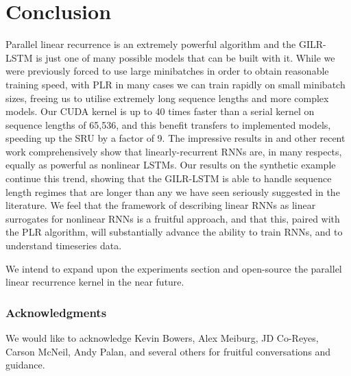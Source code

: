 \documentclass{article}
\begin{document}
\section{Conclusion}
Parallel linear recurrence is an extremely powerful algorithm and the GILR-LSTM
is just one of many possible models that can be built with it. While we were
previously forced to use large minibatches in order to obtain reasonable
training speed, with PLR in many cases we can train rapidly on small minibatch
sizes, freeing us to utilise extremely long sequence lengths and more complex
models. Our CUDA kernel is up to 40 times faster than a serial kernel on
sequence lengths of 65,536, and this benefit transfers to implemented models,
speeding up the SRU \cite{lei2017} by a factor of 9. The impressive results in
\cite{lei2017} and other recent work comprehensively show that
linearly-recurrent RNNs are, in many respects, equally as powerful as nonlinear
LSTMs. Our results on the synthetic example continue this trend, showing that
the GILR-LSTM is able to handle sequence length regimes that are longer than any
we have seen seriously suggested in the literature. We feel that the framework
of describing linear RNNs as linear surrogates for nonlinear RNNs is a fruitful
approach, and that this, paired with the PLR algorithm, will substantially
advance the ability to train RNNs, and to understand timeseries data.



We intend to expand upon the experiments section and open-source the parallel
linear recurrence kernel in the near future.

\subsubsection*{Acknowledgments}
We would like to acknowledge Kevin Bowers, Alex Meiburg, JD Co-Reyes, Carson
McNeil, Andy Palan, and several others for fruitful conversations and guidance.
\end{document}
